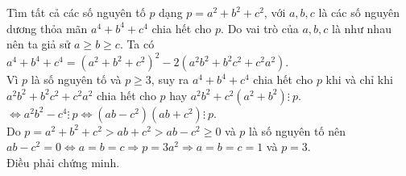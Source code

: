 \begin{ex}%
    Tìm tất cả các số nguyên tố $p$ dạng $p= a^2+b^2+c^2$, với $a, b, c$ là các số nguyên dương thỏa mãn $a^4+b^4+c^4$ chia hết cho $p$.
\loigiai
    {
    Do vai trò của $a, b, c$ là như nhau nên ta giả sử $a \geqslant b \geqslant c$. Ta có\\
    $a^4+b^4+c^4= (a^2+b^2+c^2)^2- 2(a^2b^2+ b^2c^2+ c^2a^2)$.\\
    Vì $p$ là số nguyên tố và $p \geqslant 3$, suy ra $a^4+b^4+c^4$ chia hết cho $p$ khi và chỉ khi $a^2b^2+ b^2c^2+ c^2a^2$ chia hết cho $p$ hay $a^2b^2+ c^2(a^2+b^2)  \vdots\   p$.\\
    $\Leftrightarrow a^2b^2- c^4 \vdots\  p \Leftrightarrow (ab-c^2)(ab+c^2) \vdots\ p$.\\
    Do $p= a^2+b^2+c^2> ab+c^2> ab-c^2 \geq 0$ và $p$ là số nguyên tố nên $ab-c^2= 0 \Leftrightarrow a=b=c \Rightarrow p=3a^2 \Rightarrow a=b=c=1$ và $p=3$.\\
    Điều phải chứng minh.
    }
\end{ex}

